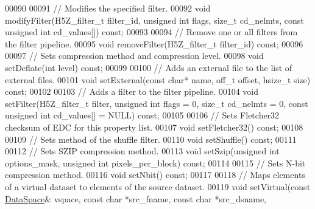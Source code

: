 \begin{DoxyCode}
00090 
00091         \textcolor{comment}{// Modifies the specified filter.}
00092         \textcolor{keywordtype}{void} modifyFilter(H5Z\_filter\_t filter\_id, \textcolor{keywordtype}{unsigned} \textcolor{keywordtype}{int} flags, \textcolor{keywordtype}{size\_t} cd\_nelmts, \textcolor{keyword}{const} \textcolor{keywordtype}{unsigned} \textcolor{keywordtype}{int} 
      cd\_values[]) \textcolor{keyword}{const};
00093 
00094         \textcolor{comment}{// Remove one or all filters from the filter pipeline.}
00095         \textcolor{keywordtype}{void} removeFilter(H5Z\_filter\_t filter\_id) \textcolor{keyword}{const};
00096 
00097         \textcolor{comment}{// Sets compression method and compression level.}
00098         \textcolor{keywordtype}{void} setDeflate(\textcolor{keywordtype}{int} level) \textcolor{keyword}{const};
00099 
00100         \textcolor{comment}{// Adds an external file to the list of external files.}
00101         \textcolor{keywordtype}{void} setExternal(\textcolor{keyword}{const} \textcolor{keywordtype}{char}* name, off\_t offset, hsize\_t size) \textcolor{keyword}{const};
00102 
00103         \textcolor{comment}{// Adds a filter to the filter pipeline.}
00104         \textcolor{keywordtype}{void} setFilter(H5Z\_filter\_t filter, \textcolor{keywordtype}{unsigned} \textcolor{keywordtype}{int} flags = 0, \textcolor{keywordtype}{size\_t} cd\_nelmts = 0, \textcolor{keyword}{const} \textcolor{keywordtype}{unsigned} \textcolor{keywordtype}{
      int} cd\_values[] = NULL) \textcolor{keyword}{const};
00105 
00106         \textcolor{comment}{// Sets Fletcher32 checksum of EDC for this property list.}
00107         \textcolor{keywordtype}{void} setFletcher32() \textcolor{keyword}{const};
00108 
00109         \textcolor{comment}{// Sets method of the shuffle filter.}
00110         \textcolor{keywordtype}{void} setShuffle() \textcolor{keyword}{const};
00111 
00112         \textcolor{comment}{// Sets SZIP compression method.}
00113         \textcolor{keywordtype}{void} setSzip(\textcolor{keywordtype}{unsigned} \textcolor{keywordtype}{int} options\_mask, \textcolor{keywordtype}{unsigned} \textcolor{keywordtype}{int} pixels\_per\_block) \textcolor{keyword}{const};
00114 
00115         \textcolor{comment}{// Sets N-bit compression method.}
00116         \textcolor{keywordtype}{void} setNbit() \textcolor{keyword}{const};
00117 
00118         \textcolor{comment}{// Maps elements of a virtual dataset to elements of the source dataset.}
00119         \textcolor{keywordtype}{void} setVirtual(\textcolor{keyword}{const} \hyperlink{class_h5_1_1_data_space}{DataSpace}& vspace, \textcolor{keyword}{const} \textcolor{keywordtype}{char} *src\_fname, \textcolor{keyword}{const} \textcolor{keywordtype}{char} *src\_dsname, \textcolor{keyword}{
}
\end{DoxyCode}
